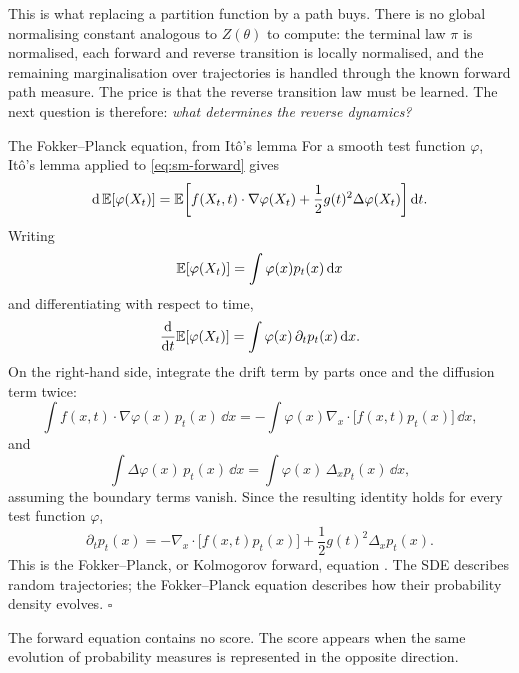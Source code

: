 This is what replacing a partition function by a path buys. There is no global
normalising constant analogous to $Z(\theta)$ to compute: the terminal law
$\pi$ is normalised, each forward and reverse transition is locally normalised,
and the remaining marginalisation over trajectories is handled through the
known forward path measure. The price is that the reverse transition law must
be learned. The next question is therefore: \emph{what determines the reverse
dynamics?}

\begin{toolbox}[tb:sm-fokkerplanck]{The Fokker--Planck equation, from Itô's lemma}
For a smooth test function $\varphi$, Itô's lemma applied to
\eqref{eq:sm-forward} gives
\[
  \mathrm{d}\,\mathbb{E}[\varphi(X_t)]
  =
  \mathbb{E}\!\left[
    f(X_t,t)\cdot\nabla\varphi(X_t)
    +
    \frac12 g(t)^2\Delta\varphi(X_t)
  \right]\mathrm{d} t.
\]
Writing
\[
  \mathbb{E}[\varphi(X_t)]
  =
  \int \varphi(x)p_t(x)\,\mathrm{d} x
\]
and differentiating with respect to time,
\[
  \frac{\mathrm{d}}{\mathrm{d} t}\mathbb{E}[\varphi(X_t)]
  =
  \int
  \varphi(x)\,
  \partial_t p_t(x)\,
  \mathrm{d} x.
\]
On the right-hand side, integrate the drift term by parts once and the
diffusion term twice:
\[
  \int
  f(x,t)\cdot\nabla\varphi(x)\,
  p_t(x)\,\dd x
  =
  -
  \int
  \varphi(x)
  \nabla_x\!\cdot\!
  \big[f(x,t)p_t(x)\big]
  \,\dd x,
\]
and
\[
  \int
  \Delta\varphi(x)\,
  p_t(x)\,\dd x
  =
  \int
  \varphi(x)\,
  \Delta_x p_t(x)\,
  \dd x,
\]
assuming the boundary terms vanish. Since the resulting identity holds for
every test function $\varphi$,
\begin{equation}
  \boxed{
  \partial_t p_t(x)
  =
  -\nabla_x\!\cdot\!
  \big[f(x,t)p_t(x)\big]
  +
  \frac12 g(t)^2\Delta_x p_t(x).
  }
  \label{eq:sm-fokkerplanck}
\end{equation}
This is the Fokker--Planck, or Kolmogorov forward, equation
\citep{gardiner2009stochastic}. The SDE describes random trajectories; the
Fokker--Planck equation describes how their probability density evolves.
\hfill$\square$
\end{toolbox}

The forward equation contains no score. The score appears when the same
evolution of probability measures is represented in the opposite direction.

